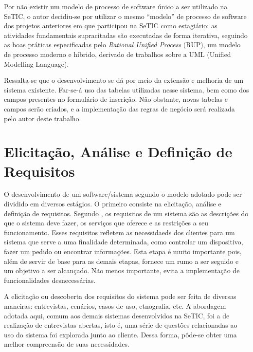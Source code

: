 \documentclass[
  10.5pt,				  %
	openright,			%
	twoside,			  %
  a5paper,
  chapter=TITLE,	%
	section=TITLE,	%
  hyphens,        %
	english,        %
	brazil          %
]{abntex2}
\begin{document}
Por não existir um modelo de processo de software único a ser utilizado na SeTIC, o autor decidiu-se por utilizar o mesmo ``modelo'' de processo de software dos projetos anteriores em que participou na SeTIC como estagiário: as atividades fundamentais supracitadas são executadas de forma iterativa, seguindo as boas práticas especificadas pelo \emph{Rational Unified Process} (RUP), um modelo de processo moderno e híbrido, derivado de trabalhos sobre a UML (Unified Modelling Language).

Ressalta-se que o desenvolvimento se dá por meio da extensão e melhoria de um sistema existente. Far-se-á uso das tabelas utilizadas nesse sistema, bem como dos campos presentes no formulário de inscrição. Não obstante, novas tabelas e campos serão criados, e a implementação das regras de negócio será realizada pelo autor deste trabalho.


\section{Elicitação, Análise e Definição de Requisitos}

O desenvolvimento de um software/sistema segundo o modelo adotado pode ser dividido em diversos estágios. O primeiro consiste na elicitação, análise e definição de requisitos. Segundo , os requisitos de um sistema são as descrições do que o sistema deve fazer, os serviços que oferece e as restrições a seu funcionamento. Esses requisitos refletem as necessidaeds dos clientes para um sistema que serve a uma finalidade determinada, como controlar um dispositivo, fazer um pedido ou encontrar informações. Esta etapa é muito importante pois, além de servir de base para as demais etapas, fornece um rumo a ser seguido e um objetivo a ser alcançado. Não menos importante, evita a implementação de funcionalidades desnecessárias.

A elicitação ou descoberta dos requisitos do sistema pode ser feita de diversas maneiras: entrevistas, cenários, casos de uso, etnografia, etc. A abordagem adotada aqui, comum aos demais sistemas desenvolvidos na SeTIC, foi a de realização de entrevistas abertas, isto é, uma série de questões relacionadas ao uso do sistema foi explorada junto ao cliente. Dessa forma, pôde-se obter uma melhor compreensão de suas necessidades.
\end{document}
